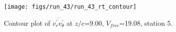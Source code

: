 \begin{figure}[H]
\centering
\texttt{[image: figs/run\_43/run\_43\_rt\_contour]}
\caption{Contour plot of $\overline{v_{r}^{\prime} v_{\theta}^{\prime}}$ at $z/c$=9.00, $V_{free}$=19.08, station 5.}
\label{fig:run_43_rt_contour}
\end{figure}


